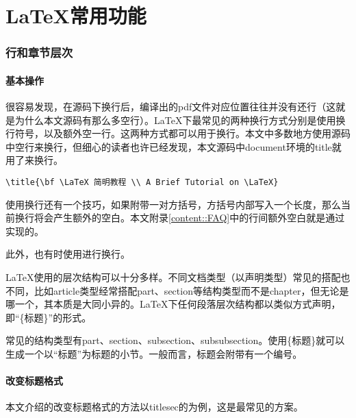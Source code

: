 
\part{\LaTeX 常用功能}

\section{行和章节层次}

\subsection{基本操作}

很容易发现，在源码下换行后，编译出的pdf文件对应位置往往并没有还行（这就是为什么本文源码有那么多空行）。\LaTeX 下最常见的两种换行方式分别是使用换行符号\textlb，以及额外空一行。这两种方式都可以用于换行。本文中多数地方使用源码中空行来换行，但细心的读者也许已经发现，本文源码中document环境的title就用了\textlb 来换行。

\begin{lstlisting}[style = latex_texworks, numbers = none]
\title{\bf \LaTeX 简明教程 \\ A Brief Tutorial on \LaTeX}
\end{lstlisting}

使用\textlb 换行还有一个技巧，如果附带一对方括号，方括号内部写入一个长度，那么当前换行将会产生额外的空白。本文附录\ref{content::FAQ}中的行间额外空白就是通过\textlb[5mm]实现的。

此外，也有时使用进行换行。

\LaTeX 使用的层次结构可以十分多样。不同文档类型（以声明类型）常见的搭配也不同，比如article类型经常搭配part、section等结构类型而不是chapter，但无论是哪一个，其本质是大同小异的。\LaTeX 下任何段落层次结构都以类似方式声明，即“\{标题\}”的形式。

常见的结构类型有part、section、subsection、subsubsection。使用\{标题\}就可以生成一个以“标题”为标题的小节。一般而言，标题会附带有一个编号。

\subsection{改变标题格式\label{content::title_format_tutorial}}

本文介绍的改变标题格式的方法以titlesec的为例，这是最常见的方案。

